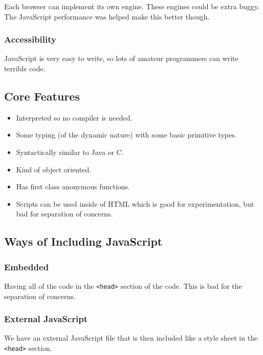 Each browser can implement its own engine.
These engines could be extra buggy.
The JavaScript performance was helped make this better though.

\subsubsection{Accessibility}\label{ssub:accessibility}

JavaScript is very easy to write, so lots of amateur programmers can write terrible code.

\subsection{Core Features}\label{sub:core_features}

\begin{itemize}
    \item Interpreted so no compiler is needed.
    \item Some typing (of the dynamic nature) with some basic primitive types.
    \item Syntactically similar to Java or C.
    \item Kind of object oriented.
    \item Has first class anonymous functions.
    \item Scripts can be used inside of HTML which is good for experimentation, but bad for separation of concerns.
\end{itemize}

\subsection{Ways of Including JavaScript}\label{sub:ways_of_including_javascript}

\subsubsection{Embedded}\label{ssub:embedded}

Having all of the code in the \texttt{<head>} section of the code.
This is bad for the separation of concerns.

\subsubsection{External JavaScript}\label{ssub:external_javascript}

We have an external JavaScript file that is then included like a style sheet in the \texttt{<head>} section.

